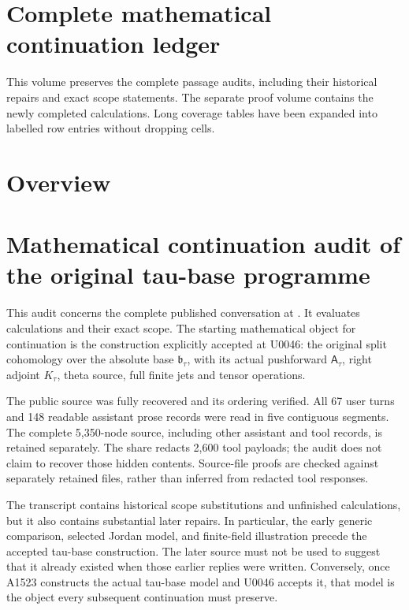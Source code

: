 


{
\setcounter{tocdepth}{1}

}
\section{Complete mathematical continuation
ledger}\label{TranscriptLedgerStage:complete-mathematical-continuation-ledger}

This volume preserves the complete passage audits, including their
historical repairs and exact scope statements. The separate proof volume
contains the newly completed calculations. Long coverage tables have
been expanded into labelled row entries without dropping cells.

\clearpage

\section{Overview}\label{TranscriptLedgerStage:overview}

\section{Mathematical continuation audit of the original tau-base
programme}\label{TranscriptLedgerStage:mathematical-continuation-audit-of-the-original-tau-base-programme}

This audit concerns the complete published conversation at
\href{https://chatgpt.com/share/6aa6bc6e-98cc-83eb-9343-e811c26d6631}{\protect{}}.
It evaluates calculations and their exact scope. The starting
mathematical object for continuation is the construction explicitly
accepted at U0046: the original split cohomology over the absolute base
\(\mathfrak b_\tau\), with its actual pushforward \(\mathsf A_\tau\),
right adjoint \(K_\tau\), theta source, full finite jets and tensor
operations.

The public source was fully recovered and its ordering verified. All 67
user turns and 148 readable assistant prose records were read in five
contiguous segments. The complete 5,350-node source, including other
assistant and tool records, is retained separately. The share redacts
2,600 tool payloads; the audit does not claim to recover those hidden
contents. Source-file proofs are checked against separately retained
files, rather than inferred from redacted tool responses.

The transcript contains historical scope substitutions and unfinished
calculations, but it also contains substantial later repairs. In
particular, the early generic comparison, selected Jordan model, and
finite-field illustration precede the accepted tau-base construction.
The later source must not be used to suggest that it already existed
when those earlier replies were written. Conversely, once A1523
constructs the actual tau-base model and U0046 accepts it, that model is
the object every subsequent continuation must preserve.

